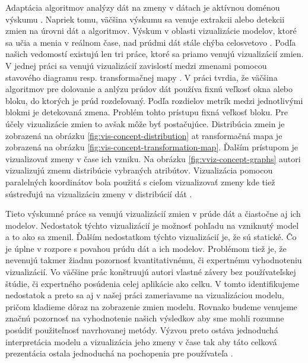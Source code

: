 Adaptácia algoritmov analýzy dát na zmeny v dátach je aktívnou doménou výskumu \citep{Yao2013, pratt2003visualizing}. Napriek tomu, väčšina výskumu sa venuje extrakcii alebo detekcii zmien na úrovni dát a algoritmov. Výskum v oblasti vizualizácie modelov, ktoré sa učia a menia v reálnom čase, nad prúdmi dát stále chýba celosvetovo \citep{Yao2013}. Podľa našich vedomostí existujú len tri práce, ktoré sa priamo venujú vizualizácií zmien. V jednej práci sa venujú vizualizácií zavislostí medzi zmenami pomocou stavového diagramu resp. transformačnej mapy \citep{Yao2013}. V práci tvrdia, že väčšina algoritmov pre dolovanie a anlýzu prúdov dát používa fixnú veľkosť okna alebo bloku, do ktorých je prúd rozdeľovaný. Podľa rozdielov metrík medzi jednotlivými blokmi je detekovaná zmena. Problém tohto prístupu fixná veľkosť bloku. Pre účely vizualizácie zmien to avšak môže byť postačujúce. Distribúcia zmein je zobrazená na obrázku \ref{fig:vis-concept-distribution} at ransformačná mapa je zobrazená na obrázku \ref{fig:vis-concept-transformation-map}. Ďalším prístupom je vizualizovať zmeny v čase ich vzniku. Na obrázku \ref{fig:vviz-concept-graphs} autori vizualizujú zmenu distribúcie vybraných atribútov. Vizualizácia pomocou paralelných koordinátov bola použitá s cieľom vizualizovať zmeny kde tiež sústreďujú na vizualizáciu zmeny v distribúcií dát \citep{pratt2003visualizing}.
\label{fig:vis-concept-distribution}

\label{fig:vis-concept-transformation-map}

\label{fig:vviz-concept-graphs}

Tieto výskumné práce sa venujú vizualizácií zmien v prúde dát a čiastočne aj ich modelov. Nedostatok týchto vizualizácií je možnosť pohľadu na vzniknutý model a to ako sa zmenil. Ďalším nedostatkom týchto vizualizácií je, že sú statické. Čo je úplne v rozpore s povahou prúdu dát a ich modelov. Problémom tiež je, že nevenujú takmer žiadnu pozornosť kvantitativnému, či expertnému vyhodnoteniu vizualizácií. Vo väčšine prác konštruujú autori vlastné závery bez používateľskej štúdie, či expertného posúdenia celej aplikácie ako celku. V tomto identifikujeme nedostatok a preto sa aj v našej práci zameriavame na vizualizáciou modelu, pričom kladieme dôraz na zobrazenie zmien modelu. Rovnako budeme venujeme značnú pozornosť na vyhodnotenie našich výsledkov aby sme mohli rozumne posúdiť použiteľnosť navrhovanej metódy. Výzvou preto ostáva jednoduchá interpretácia modelu a vizualizácia jeho zmeny v čase tak aby táto celková prezentácia ostala jednoduchá na pochopenia pre používateľa \citep{Demsar2014, Yao2013}. 







